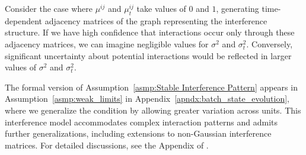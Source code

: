 % 
\begin{example}
    Consider the case where $\mu^{ij}$ and $\mu^{ij}_t$ take values of $0$ and $1$, generating time-dependent adjacency matrices of the graph representing the interference structure. If we have high confidence that interactions occur only through these adjacency matrices, we can imagine negligible values for $\sigma^2$ and $\sigma^2_t$. Conversely, significant uncertainty about potential interactions would be reflected in larger values of $\sigma^2$ and $\sigma^2_t$. %
\end{example}
% 
\begin{remark}
    The formal version of Assumption~\ref{asmp:Stable Interference Pattern} appears in Assumption~\ref{asmp:weak_limits} in Appendix~\ref{apndx:batch_state_evolution}, where we generalize the condition by allowing greater variation across units. This interference model accommodates complex interaction patterns and admits further generalizations, including extensions to non-Gaussian interference matrices. For detailed discussions, see the Appendix of \cite{shirani2024causal}.
\end{remark}
% 

